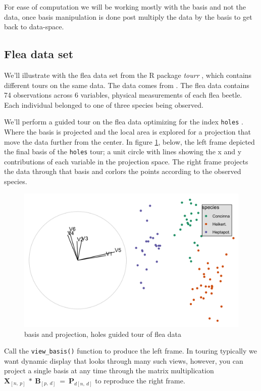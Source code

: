 \documentclass{monashthesis}
\begin{document}
For ease of computation we will be working mostly with the basis and not the data, once basis manipulation is done post multiply the data by the basis to get back to data-space.

\hypertarget{flea-data-set}{%
\subsection{Flea data set}\label{flea-data-set}}

We'll illustrate with the flea data set from the R package \emph{tourr} \autocite{wickham_tourr_2011}, which contains different tours on the same data. The data comes from \textcite{lubischew_use_1962}. The flea data contains 74 observations across 6 variables, physical measurements of each flea beetle. Each individual belonged to one of three species being observed.

We'll perform a guided tour on the flea data optimizing for the index \texttt{holes} \autocite{cook_interactive_2007}. Where the basis is projected and the local area is explored for a projection that move the data further from the center. In figure \ref{fig:step0}, below, the left frame depicted the final basis of the \texttt{holes} tour; a unit circle with lines showing the x and y contributions of each variable in the projection space. The right frame projects the data through that basis and corlors the points according to the observed species.

\begin{figure}
\includegraphics[width=1\linewidth]{./output/step0_basis+proj} \caption{basis and projection, holes guided tour of flea data}\label{fig:step0}
\end{figure}

Call the \texttt{view\_basis()} function to produce the left frame. In touring typically we want dynamic display that looks through many such views, however, you can project a single basis at any time through the matrix multiplication \(\textbf{X}_{[n,~p]} ~*~ \textbf{B}_{[p,~d]} ~=~ \textbf{P}_{d[n,~d]}\) to reproduce the right frame.
\end{document}
